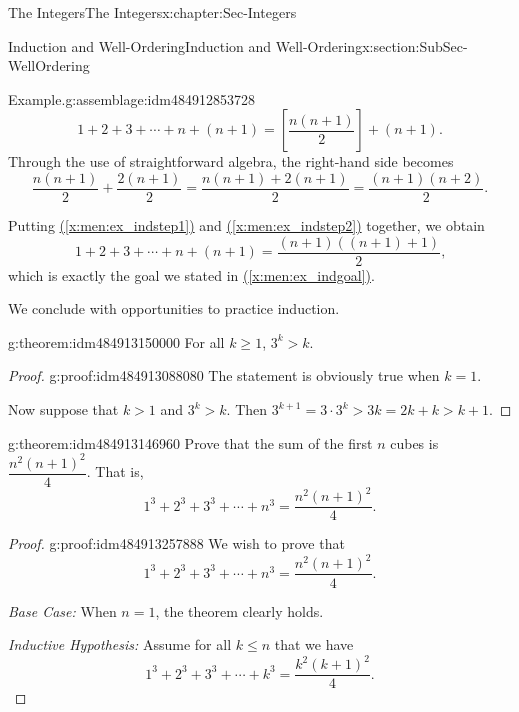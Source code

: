 \documentclass[oneside,10pt,]{book}
\newcommand{\xreffont}{\relax}
\numberwithin{equation}{section}
\renewcommand{\le}{\leqslant}
\renewcommand{\ge}{\geqslant}
\begin{document}
\begin{chapterptx}{The Integers}{}{The Integers}{}{}{x:chapter:Sec-Integers}
\begin{sectionptx}{Induction and Well-Ordering}{}{Induction and Well-Ordering}{}{}{x:section:SubSec-WellOrdering}
\begin{assemblage}{Example.}{g:assemblage:idm484912853728}
\begin{equation}
1+ 2 + 3 + \cdots + n + (n+1) = \left[\frac{n(n+1)}{2}\right] + (n+1)\text{.}\label{x:men:ex_indstep1}
\end{equation}
Through the use of straightforward algebra, the right-hand side becomes%
\begin{equation}
\frac{n(n+1)}{2} + \frac{2(n+1)}{2} = \frac{n(n+1) + 2(n+1)}{2} = \frac{(n+1)(n+2)}{2}\text{.}\label{x:men:ex_indstep2}
\end{equation}
%
\par
Putting \hyperref[x:men:ex_indstep1]{({\xreffont\ref{x:men:ex_indstep1}})} and \hyperref[x:men:ex_indstep2]{({\xreffont\ref{x:men:ex_indstep2}})} together, we obtain%
\begin{equation*}
1+ 2 + 3 + \cdots + n + (n+1) = \frac{(n+1)((n+1)+1)}{2}\text{,}
\end{equation*}
which is exactly the goal we stated in \hyperref[x:men:ex_indgoal]{({\xreffont\ref{x:men:ex_indgoal}})}.%
\end{assemblage}
We conclude with opportunities to practice induction.%
\begin{theorem}{}{}{g:theorem:idm484913150000}%
For all \(k\ge 1\), \(3^k > k\).%
\end{theorem}
\begin{proof}{}{g:proof:idm484913088080}
The statement is obviously true when \(k=1\).%
\par
Now suppose that \(k > 1\) and \(3^k > k\). Then \(3^{k+1} = 3\cdot 3^k > 3k = 2k + k > k+1\).%
\end{proof}
\begin{theorem}{}{}{g:theorem:idm484913146960}%
Prove that the sum of the first \(n\) cubes is \(\dfrac{n^2(n+1)^2}{4}\). That is,%
%
\begin{equation*}
1^3 + 2^3 + 3^3 + \cdots + n^3 = \dfrac{n^2(n+1)^2}{4}.
\end{equation*}
\end{theorem}
\begin{proof}{}{g:proof:idm484913257888}
We wish to prove that%
\begin{equation*}
1^3 + 2^3 + 3^3 + \cdots + n^3 = \frac{n^2(n+1)^2}{4}.
\end{equation*}
%
\par
\emph{Base Case:} When \(n=1\), the theorem clearly holds.%
\par
\emph{Inductive Hypothesis:} Assume for all \(k\le n\) that we have%
\begin{equation}
1^3 + 2^3 + 3^3 + \cdots + k^3 = \frac{k^2(k+1)^2}{4}.\label{x:men:eq-sum-of-cubes-ind-hyp}

\end{equation}
\end{proof}
\end{sectionptx}
\end{chapterptx}
\end{document}
